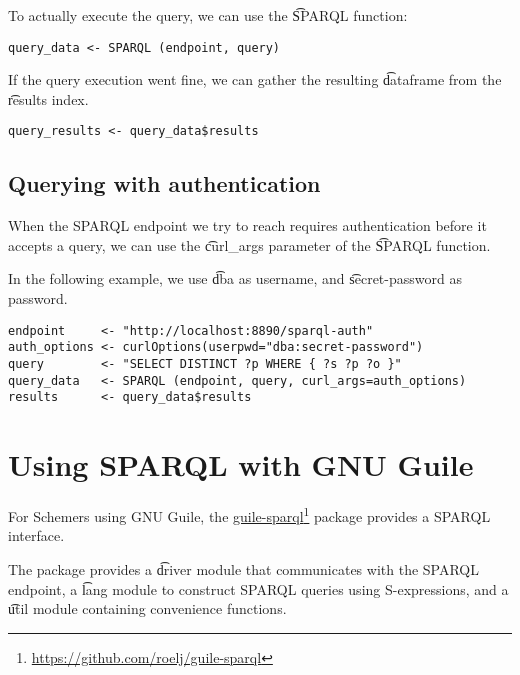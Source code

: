   To actually execute the query, we can use the \t{SPARQL} function:
\begin{siderules}
\begin{verbatim}
query_data <- SPARQL (endpoint, query)
\end{verbatim}
\end{siderules}

  If the query execution went fine, we can gather the resulting
  \t{dataframe} from the \t{results} index.

\begin{siderules}
\begin{verbatim}
query_results <- query_data$results
\end{verbatim}
\end{siderules}

\subsection{Querying with authentication}

  When the SPARQL endpoint we try to reach requires authentication before
  it accepts a query, we can use the \t{curl\_args} parameter of the
  \t{SPARQL} function.

  In the following example, we use \t{dba} as username, and
  \t{secret-password} as password.

\begin{siderules}
\begin{verbatim}
endpoint     <- "http://localhost:8890/sparql-auth"
auth_options <- curlOptions(userpwd="dba:secret-password")
query        <- "SELECT DISTINCT ?p WHERE { ?s ?p ?o }"
query_data   <- SPARQL (endpoint, query, curl_args=auth_options)
results      <- query_data$results
\end{verbatim}
\end{siderules}

\section{Using SPARQL with GNU Guile}
\label{sec:sparql-with-guile}

  For Schemers using GNU Guile, the \href{https://github.com/roelj/guile-sparql}%
  {guile-sparql}\footnote{\url{https://github.com/roelj/guile-sparql}} package
  provides a SPARQL interface.

  The package provides a \t{driver} module that communicates with the
  SPARQL endpoint, a \t{lang} module to construct SPARQL queries using
  S-expressions, and a \t{util} module containing convenience functions.

